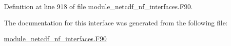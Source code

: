 Definition at line 918 of file module\+\_\+netcdf\+\_\+nf\+\_\+interfaces.\+F90.



The documentation for this interface was generated from the following file\+:\begin{DoxyCompactItemize}
\item 
\hyperlink{module__netcdf__nf__interfaces_8F90}{module\+\_\+netcdf\+\_\+nf\+\_\+interfaces.\+F90}\end{DoxyCompactItemize}
